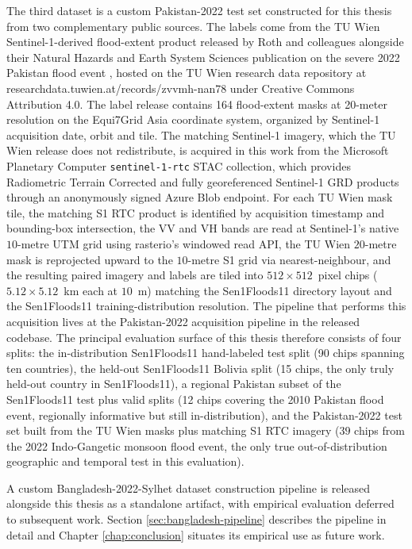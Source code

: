 \documentclass[11pt,a4paper,oneside]{report}
\begin{document}
The third dataset is a custom Pakistan-2022 test set constructed for this thesis from two complementary public sources. The labels come from the TU Wien Sentinel-1-derived flood-extent product released by Roth and colleagues alongside their Natural Hazards and Earth System Sciences publication on the severe 2022 Pakistan flood event \cite{Roth2023Pakistan}, hosted on the TU Wien research data repository at researchdata.tuwien.at/records/zvvmh-nan78 under Creative Commons Attribution 4.0. The label release contains 164 flood-extent masks at 20-meter resolution on the Equi7Grid Asia coordinate system, organized by Sentinel-1 acquisition date, orbit and tile. The matching Sentinel-1 imagery, which the TU Wien release does not redistribute, is acquired in this work from the Microsoft Planetary Computer \texttt{sentinel-1-rtc} STAC collection, which provides Radiometric Terrain Corrected and fully georeferenced Sentinel-1 GRD products through an anonymously signed Azure Blob endpoint. For each TU Wien mask tile, the matching S1 RTC product is identified by acquisition timestamp and bounding-box intersection, the VV and VH bands are read at Sentinel-1's native $10$-metre UTM grid using rasterio's windowed read API, the TU Wien $20$-metre mask is reprojected upward to the $10$-metre S1 grid via nearest-neighbour, and the resulting paired imagery and labels are tiled into $512 \times 512$~pixel chips ($5.12 \times 5.12$~km each at $10$~m) matching the Sen1Floods11 directory layout and the Sen1Floods11 training-distribution resolution. The pipeline that performs this acquisition lives at the Pakistan-2022 acquisition pipeline in the released codebase. The principal evaluation surface of this thesis therefore consists of four splits: the in-distribution Sen1Floods11 hand-labeled test split (90 chips spanning ten countries), the held-out Sen1Floods11 Bolivia split (15 chips, the only truly held-out country in Sen1Floods11), a regional Pakistan subset of the Sen1Floods11 test plus valid splits (12 chips covering the 2010 Pakistan flood event, regionally informative but still in-distribution), and the Pakistan-2022 test set built from the TU Wien masks plus matching S1 RTC imagery ($39$ chips from the 2022 Indo-Gangetic monsoon flood event, the only true out-of-distribution geographic and temporal test in this evaluation).

A custom Bangladesh-2022-Sylhet dataset construction pipeline is released alongside this thesis as a standalone artifact, with empirical evaluation deferred to subsequent work. Section \ref{sec:bangladesh-pipeline} describes the pipeline in detail and Chapter \ref{chap:conclusion} situates its empirical use as future work.
\end{document}
